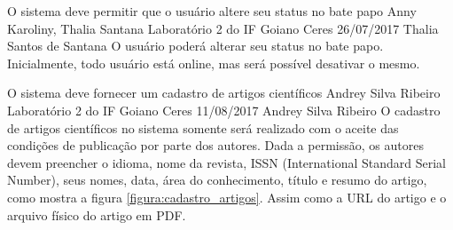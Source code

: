  {O sistema deve permitir que o usuário altere seu status no bate papo}
 {Anny Karoliny, Thalia Santana}
 {Laboratório 2 do IF Goiano Ceres}
 {26/07/2017}
 {Thalia Santos de Santana}
 { O usuário poderá alterar seu status no bate papo. Inicialmente, todo usuário está online, mas será possível desativar o mesmo.
 }	
 


 {O sistema deve fornecer um cadastro de artigos científicos}
 {Andrey Silva Ribeiro}
 {Laboratório 2 do IF Goiano Ceres}
 {11/08/2017}
 {Andrey Silva Ribeiro}
 { O cadastro de artigos científicos no sistema somente será realizado com o aceite das condições de publicação por parte dos autores. Dada a permissão, os autores devem preencher o idioma, nome da revista, ISSN (International Standard Serial Number), seus nomes, data, área do conhecimento, título e resumo do artigo, como mostra a figura \ref{figura:cadastro_artigos}. Assim como a URL do artigo e o arquivo físico do artigo em PDF.
 }